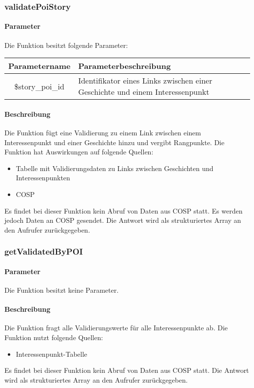 \subsubsection{validatePoiStory}
\paragraph{Parameter} Die Funktion besitzt folgende Parameter:
\begin{table}[H]
	\begin{tabular}{|c|p{11cm}|}
		\hline
		\textbf{Parametername} & \textbf{Parameterbeschreibung} \\ \hline
		\$story\_poi\_id & Identifikator eines Links zwischen einer Geschichte und einem Interessenpunkt \\ \hline
	\end{tabular}
\end{table}
\paragraph{Beschreibung} Die Funktion fügt eine Validierung zu einem Link zwischen einem Interessenpunkt und einer Geschichte hinzu und vergibt Rangpunkte. Die Funktion hat Auswirkungen auf folgende Quellen:
\begin{itemize}
	\item Tabelle mit Validierungsdaten zu Links zwischen Geschichten und Interessenpunkten
	\item COSP
\end{itemize}
Es findet bei dieser Funktion kein Abruf von Daten aus {\glqq COSP\grqq} statt. Es werden jedoch Daten an {\glqq COSP\grqq} gesendet. Die Antwort wird als strukturiertes Array an den Aufrufer zurückgegeben.
\subsubsection{getValidatedByPOI}
\paragraph{Parameter} Die Funktion besitzt keine Parameter.
\paragraph{Beschreibung} Die Funktion fragt alle Validierungswerte für alle Interessenpunkte ab. Die Funktion nutzt folgende Quellen:
\begin{itemize}
	\item Interessenpunkt-Tabelle
\end{itemize}
Es findet bei dieser Funktion kein Abruf von Daten aus {\glqq COSP\grqq} statt. Die Antwort wird als strukturiertes Array an den Aufrufer zurückgegeben.
